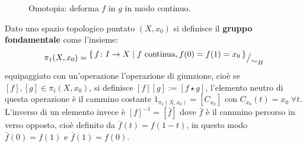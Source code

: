 \begin{figure}[htbp]
  \centering
  \caption{Omotopia: deforma $ f $ in $ g $ in modo continuo.}
  \label{fig:lez3:homotopy}
\end{figure}
\begin{definition}
  Dato uno spazio topologico puntato $ (X,x_0) $ si definisce il \textbf{gruppo
    fondamentale} come l'insieme:
  \[
    \pi_1(X,x_0) = {^{\textstyle \set{f \colon I \to X | f \text{ continua}, f(0) = f(1) = x_0}}\big/_{\textstyle \sim_H}}
  \]
  equipaggiato con un'operazione l'operazione di giunzione, cioè se
  $ [f], [g] \in \pi_i(X,x_0) $, si definisce $ [f][g] := [f \star g] $, l'elemento
  neutro di questa operazione è il cammino costante
  $ 1_{\pi_1(X,x_0)} = [C_{x_0}] $ con $ C_{x_0}(t) = x_0 \; \forall t $. L'inverso di
  un elemento invece è $ [f]^{-1} = [\bar{f}] $ dove $ \bar{f} $ è il cammino
  percorso in verso opposto, cioè definito da $ \bar{f}(t) = f(1-t) $, in questo
  modo $ \bar{f}(0) = f(1) $ e $ \bar{f}(1) = f(0) $.
\end{definition}

